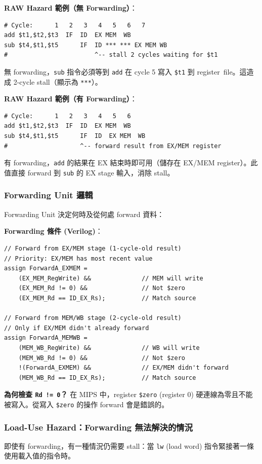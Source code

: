 \documentclass[journal]{IEEEtran}
\begin{document}
\textbf{RAW Hazard 範例（無 Forwarding）}：
\begin{lstlisting}
# Cycle:      1   2   3   4   5   6   7
add $t1,$t2,$t3  IF  ID  EX MEM  WB
sub $t4,$t1,$t5      IF  ID *** *** EX MEM WB
#                        ^-- stall 2 cycles waiting for $t1
\end{lstlisting}

無 forwarding，\texttt{sub} 指令必須等到 \texttt{add} 在 cycle 5 寫入 \texttt{\$t1} 到 register~file。這造成 2-cycle stall（顯示為 \texttt{***}）。

\textbf{RAW Hazard 範例（有 Forwarding）}：
\begin{lstlisting}
# Cycle:      1   2   3   4   5   6
add $t1,$t2,$t3  IF  ID  EX MEM  WB
sub $t4,$t1,$t5      IF  ID  EX MEM  WB
#                    ^-- forward result from EX/MEM register
\end{lstlisting}

有 forwarding，\texttt{add} 的結果在 EX 結束時即可用（儲存在 EX/MEM register）。此值直接 forward 到 \texttt{sub} 的 EX stage 輸入，消除 stall。

\subsubsection{Forwarding Unit 邏輯}
Forwarding Unit 決定何時及從何處 forward 資料：

\textbf{Forwarding 條件 (Verilog)}：
\begin{lstlisting}
// Forward from EX/MEM stage (1-cycle-old result)
// Priority: EX/MEM has most recent value
assign ForwardA_EXMEM = 
    (EX_MEM_RegWrite) &&              // MEM will write
    (EX_MEM_Rd != 0) &&               // Not $zero
    (EX_MEM_Rd == ID_EX_Rs);          // Match source

// Forward from MEM/WB stage (2-cycle-old result)
// Only if EX/MEM didn't already forward
assign ForwardA_MEMWB = 
    (MEM_WB_RegWrite) &&              // WB will write
    (MEM_WB_Rd != 0) &&               // Not $zero
    !(ForwardA_EXMEM) &&              // EX/MEM didn't forward
    (MEM_WB_Rd == ID_EX_Rs);          // Match source
\end{lstlisting}

\textbf{為何檢查 \texttt{Rd != 0}？} 在 MIPS 中，register \texttt{\$zero} (register 0) 硬連線為零且不能被寫入。從寫入 \texttt{\$zero} 的操作 forward 會是錯誤的。

\subsubsection{Load-Use Hazard：Forwarding 無法解決的情況}
即使有 forwarding，有一種情況仍需要 stall：當 \texttt{lw} (load word) 指令緊接著一條使用載入值的指令時。
\end{document}
